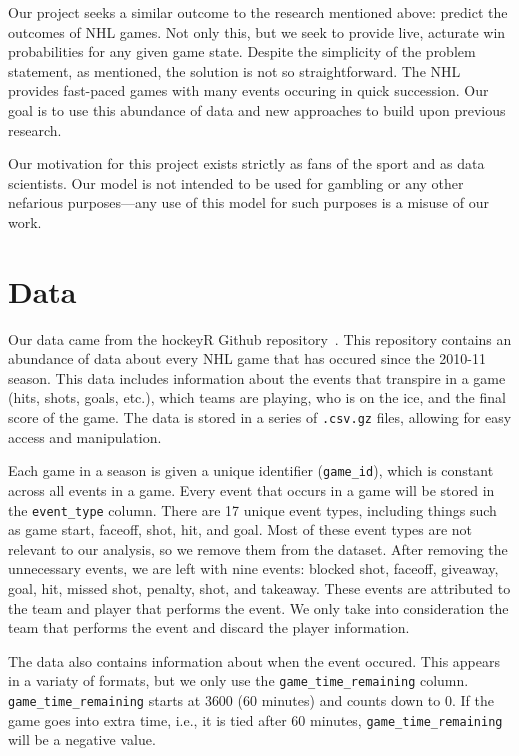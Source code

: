 \documentclass[11pt]{article}
\begin{document}
Our project seeks a similar outcome to the research mentioned above: predict the outcomes of NHL games. Not only this,
but we seek to provide live, acturate win probabilities for any given game state. Despite the simplicity of the problem statement, 
as mentioned, the solution is not so straightforward. The NHL provides fast-paced games with many events
occuring in quick succession. Our goal is to use this abundance of data and new approaches to build upon previous research.

Our motivation for this project exists strictly as fans of the sport and as data scientists. Our model is not intended to be used for gambling or any other
nefarious purposes—any use of this model for such purposes is a misuse of our work.

\section{Data}
Our data came from the hockeyR Github repository~\cite{hockeyR-data}. This repository contains an abundance of data about every NHL game
that has occured since the 2010-11 season. This data includes information about the events that transpire in a game (hits, shots, goals, etc.),
which teams are playing, who is on the ice, and the final score of the game. The data is stored in a series of {\tt .csv.gz} files, allowing for
easy access and manipulation.

Each game in a season is given a unique identifier ({\tt game\_id}), which is constant across all events in a game. Every event that occurs in a game
will be stored in the {\tt event\_type} column. There are 17 unique event types, including things such as game start, faceoff, shot, hit, and goal.
Most of these event types are not relevant to our analysis, so we remove them from the dataset. After removing the unnecessary events, we are left with
nine events: blocked shot, faceoff, giveaway, goal, hit, missed shot, penalty, shot, and takeaway. These events are attributed to the
team and player that performs the event. We only take into consideration the team that performs the event and discard the player information.

The data also contains information about when the event occured. This appears in a variaty of formats, but we only
use the {\tt game\_time\_remaining} column. {\tt game\_time\_remaining} starts
at 3600 (60 minutes) and counts down to 0. If the game goes into extra time, i.e., it is tied after 60 minutes, {\tt game\_time\_remaining} will
be a negative value.
\end{document}
